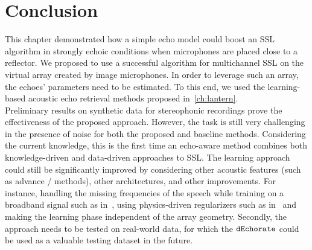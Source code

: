 

\section{Conclusion}
This chapter demonstrated how a simple echo model could boost an \ac{SSL} algorithm in strongly echoic conditions when microphones are placed close to a reflector.
We proposed to use a successful algorithm for multichannel \ac{SSL} on the virtual array created by image microphones.
In order to leverage such an array, the echoes' parameters need to be estimated.
To this end, we used the learning-based acoustic echo retrieval methods proposed in~\cref{ch:lantern}.
\\Preliminary results on synthetic data for stereophonic recordings prove the effectiveness of the proposed approach.
However, the task is still very challenging in the presence of noise for both the proposed and baseline methods.
Considering the current knowledge, this is the first time an echo-aware method combines both knowledge-driven and data-driven approaches to \ac{SSL}.
The learning approach could still be significantly improved by considering other acoustic features (such as advance \ReTF/ methods), other architectures, and other improvements.
For instance, handling the missing frequencies of the speech while training on a broadband signal such as in~,
using physics-driven regularizers such as in~ and making the learning phase independent of the array geometry.
Secondly, the approach needs to be tested on real-world data, for which the $\texttt{dEchorate}$ could be used as a valuable testing dataset in the future.